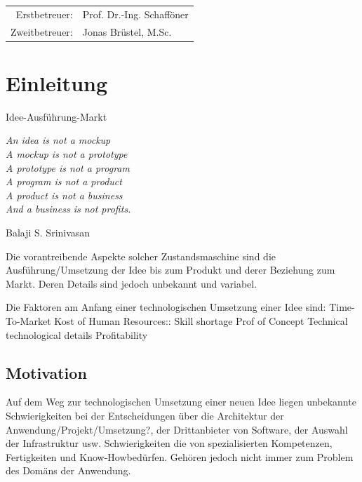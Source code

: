 \documentclass[
12pt,
english,
ngerman,
headsepline,
twoside,
openright,
numbers=noenddot,version=first
]{scrreprt}
\providecommand{\tabularnewline}{\\}
\let\myTOC\tableofcontents
\renewcommand\tableofcontents{
    \begin{spacing}{1.1}
    \myTOC
    \end{spacing}
    \clearpage
    \pagenumbering{arabic}
}
\begin{document}
\vspace{1cm}

\noindent \begin{center}
\medskip{}
\begin{tabular}{rl}
Erstbetreuer: & Prof. Dr.-Ing. Schafföner\tabularnewline
Zweitbetreuer: & Jonas Brüstel, M.Sc.\tabularnewline
\end{tabular}
\par\end{center}

\noindent \begin{center}
{\huge }
\par\end{center}{\huge \par}

\newpage{}

%
\tableofcontents{}

\pagestyle{scrheadings}   


\chapter{Einleitung}{Idee-Ausführung-Markt}
\setcounter{page}{1}
\label{chap:introduction}
\epigraph{\textit{\textquotedbl{}
		An idea is not a mockup\\
		A mockup is not a prototype\\
		A prototype is not a program\\
		A program is not a product\\
		A product is not a business\\
		And a business is not profits.\textquotedbl{}}}{
	Balaji S. Srinivasan }


Die vorantreibende Aspekte solcher Zustandsmaschine sind die Ausführung/Umsetzung der Idee bis zum Produkt und derer Beziehung zum Markt. Deren Details sind jedoch unbekannt und variabel. 

Die Faktoren am Anfang einer technologischen Umsetzung einer Idee sind: 
Time-To-Market
Kost of Human Resources:: Skill shortage
Prof of Concept
Technical technological details
Profitability


\section{Motivation}


Auf dem Weg zur technologischen Umsetzung einer neuen Idee liegen unbekannte Schwierigkeiten
bei der Entscheidungen über die Architektur der Anwendung/Projekt/Umsetzung?,
der Drittanbieter von Software, der Auswahl der Infrastruktur usw.
Schwierigkeiten die von spezialisierten Kompetenzen, Fertigkeiten und \glqq Know-How\grqq bedürfen.
Gehören jedoch nicht immer zum Problem des Domäns der Anwendung.
\end{document}

